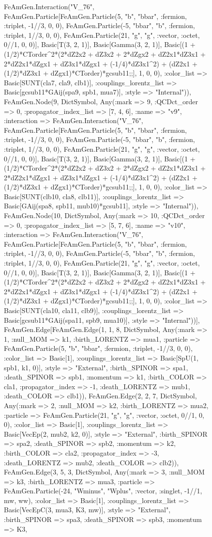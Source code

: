 \documentclass{revtex4}
\begin{document}
\begin{figure}[!htb]
\begin{center}
{FeAmGen.Interaction("V_76", FeAmGen.Particle[FeAmGen.Particle(5, "b", "bbar", :fermion, :triplet, -1//3, 0, 0), FeAmGen.Particle(-5, "bbar", "b", :fermion, :triplet, 1//3, 0, 0), FeAmGen.Particle(21, "g", "g", :vector, :octet, 0//1, 0, 0)], Basic[T(3, 2, 1)], Basic[Gamma(3, 2, 1)], Basic[(1 + (1/2)*CTorder^2*(2*dZ2x2 + dZ3x2 + 2*dZgx2 + dZ2x1*dZ3x1 + 2*dZ2x1*dZgx1 + dZ3x1*dZgx1 + (-1/4)*dZ3x1^2) + (dZ2x1 + (1/2)*dZ3x1 + dZgx1)*CTorder)*gcsub11;;], 1, 0, 0), :color_list => Basic[SUNT(cla7, cla9, clb1)], :couplings_lorentz_list => Basic[gcsub11*GAij(spa9, spb1, mua7)], :style => "Internal")), FeAmGen.Node(9, Dict{Symbol, Any}(:mark => 9, :QCDct_order => 0, :propagator_index_list => [7, 4, 6], :name => "v9", :interaction => FeAmGen.Interaction("V_76", FeAmGen.Particle[FeAmGen.Particle(5, "b", "bbar", :fermion, :triplet, -1//3, 0, 0), FeAmGen.Particle(-5, "bbar", "b", :fermion, :triplet, 1//3, 0, 0), FeAmGen.Particle(21, "g", "g", :vector, :octet, 0//1, 0, 0)], Basic[T(3, 2, 1)], Basic[Gamma(3, 2, 1)], Basic[(1 + (1/2)*CTorder^2*(2*dZ2x2 + dZ3x2 + 2*dZgx2 + dZ2x1*dZ3x1 + 2*dZ2x1*dZgx1 + dZ3x1*dZgx1 + (-1/4)*dZ3x1^2) + (dZ2x1 + (1/2)*dZ3x1 + dZgx1)*CTorder)*gcsub11;;], 1, 0, 0), :color_list => Basic[SUNT(clb10, cla8, clb11)], :couplings_lorentz_list => Basic[GAij(spa8, spb11, mub10)*gcsub11], :style => "Internal")), FeAmGen.Node(10, Dict{Symbol, Any}(:mark => 10, :QCDct_order => 0, :propagator_index_list => [5, 7, 6], :name => "v10", :interaction => FeAmGen.Interaction("V_76", FeAmGen.Particle[FeAmGen.Particle(5, "b", "bbar", :fermion, :triplet, -1//3, 0, 0), FeAmGen.Particle(-5, "bbar", "b", :fermion, :triplet, 1//3, 0, 0), FeAmGen.Particle(21, "g", "g", :vector, :octet, 0//1, 0, 0)], Basic[T(3, 2, 1)], Basic[Gamma(3, 2, 1)], Basic[(1 + (1/2)*CTorder^2*(2*dZ2x2 + dZ3x2 + 2*dZgx2 + dZ2x1*dZ3x1 + 2*dZ2x1*dZgx1 + dZ3x1*dZgx1 + (-1/4)*dZ3x1^2) + (dZ2x1 + (1/2)*dZ3x1 + dZgx1)*CTorder)*gcsub11;;], 1, 0, 0), :color_list => Basic[SUNT(cla10, cla11, clb9)], :couplings_lorentz_list => Basic[gcsub11*GAij(spa11, spb9, mua10)], :style => "Internal"))], FeAmGen.Edge[FeAmGen.Edge(1, 1, 8, Dict{Symbol, Any}(:mark => 1, :null_MOM => k1, :birth_LORENTZ => mua1, :particle => FeAmGen.Particle(5, "b", "bbar", :fermion, :triplet, -1//3, 0, 0), :color_list => Basic[1], :couplings_lorentz_list => Basic[SpU(1, spb1, k1, 0)], :style => "External", :birth_SPINOR => spa1, :death_SPINOR => spb1, :momentum => k1, :birth_COLOR => cla1, :propagator_index => -1, :death_LORENTZ => mub1, :death_COLOR => clb1)), FeAmGen.Edge(2, 2, 7, Dict{Symbol, Any}(:mark => 2, :null_MOM => k2, :birth_LORENTZ => mua2, :particle => FeAmGen.Particle(21, "g", "g", :vector, :octet, 0//1, 0, 0), :color_list => Basic[1], :couplings_lorentz_list => Basic[VecEp(2, mub2, k2, 0)], :style => "External", :birth_SPINOR => spa2, :death_SPINOR => spb2, :momentum => k2, :birth_COLOR => cla2, :propagator_index => -3, :death_LORENTZ => mub2, :death_COLOR => clb2)), FeAmGen.Edge(3, 5, 3, Dict{Symbol, Any}(:mark => 3, :null_MOM => k3, :birth_LORENTZ => mua3, :particle => FeAmGen.Particle(-24, "Wminus", "Wplus", :vector, :singlet, -1//1, mw, ww), :color_list => Basic[1], :couplings_lorentz_list => Basic[VecEpC(3, mua3, K3, mw)], :style => "External", :birth_SPINOR => spa3, :death_SPINOR => spb3, :momentum => K3, }
\end{center}
\end{figure}
\end{document}

